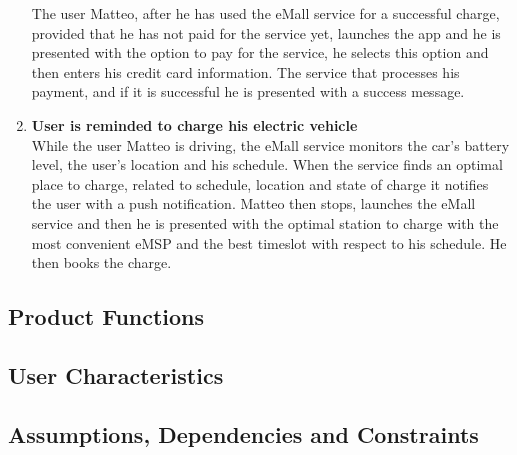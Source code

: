 \begin{enumerate}
    The user Matteo, after he has used the eMall service for a successful charge, provided that he has not paid for the service yet,
    launches the app and he is presented with the option to pay for the service, 
    he selects this option and then enters his credit card information.
    The service that processes his payment, and if it is successful he is presented with a success message.
    \item \textbf{User is reminded to charge his electric vehicle}\\
    While the user Matteo is driving, the eMall service monitors the car's battery level, the user's location and his schedule. 
    When the service finds an optimal place to charge, related to schedule, location and state of charge it notifies the user with a push notification.
    Matteo then stops, launches the eMall service and then he is presented with the optimal station to charge with the most convenient eMSP and the best timeslot with respect to his schedule. He then books the charge.
\end{enumerate}
\subsection{Product Functions}
\subsection{User Characteristics}
\subsection{Assumptions, Dependencies and Constraints}